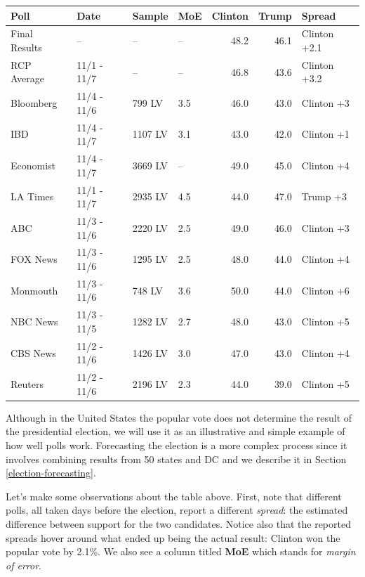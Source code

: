 \documentclass[openany]{book}
\begin{document}
\begin{table}[H]
\centering\begingroup\fontsize{8}{10}\selectfont

\begin{tabular}{llllrrl}
\toprule
Poll & Date & Sample & MoE & Clinton & Trump & Spread\\
\midrule
Final Results & -- & -- & -- & 48.2 & 46.1 & Clinton +2.1\\
RCP Average & 11/1 - 11/7 & -- & -- & 46.8 & 43.6 & Clinton +3.2\\
Bloomberg & 11/4 - 11/6 & 799 LV & 3.5 & 46.0 & 43.0 & Clinton +3\\
IBD & 11/4 - 11/7 & 1107 LV & 3.1 & 43.0 & 42.0 & Clinton +1\\
Economist & 11/4 - 11/7 & 3669 LV & -- & 49.0 & 45.0 & Clinton +4\\
\addlinespace
LA Times & 11/1 - 11/7 & 2935 LV & 4.5 & 44.0 & 47.0 & Trump +3\\
ABC & 11/3 - 11/6 & 2220 LV & 2.5 & 49.0 & 46.0 & Clinton +3\\
FOX News & 11/3 - 11/6 & 1295 LV & 2.5 & 48.0 & 44.0 & Clinton +4\\
Monmouth & 11/3 - 11/6 & 748 LV & 3.6 & 50.0 & 44.0 & Clinton +6\\
NBC News & 11/3 - 11/5 & 1282 LV & 2.7 & 48.0 & 43.0 & Clinton +5\\
\addlinespace
CBS News & 11/2 - 11/6 & 1426 LV & 3.0 & 47.0 & 43.0 & Clinton +4\\
Reuters & 11/2 - 11/6 & 2196 LV & 2.3 & 44.0 & 39.0 & Clinton +5\\
\bottomrule
\end{tabular}
\endgroup{}
\end{table}

Although in the United States the popular vote does not determine the result of the presidential election, we will use it as an illustrative and simple example of how well polls work. Forecasting the election is a more complex process since it involves combining results from 50 states and DC and we describe it in Section \ref{election-forecasting}.

Let's make some observations about the table above. First, note that different polls, all taken days before the election, report a different \emph{spread}: the estimated difference between support for the two candidates. Notice also that the reported spreads hover around what ended up being the actual result: Clinton won the popular vote by 2.1\%. We also see a column titled \textbf{MoE} which stands for \emph{margin of error}.
\end{document}
